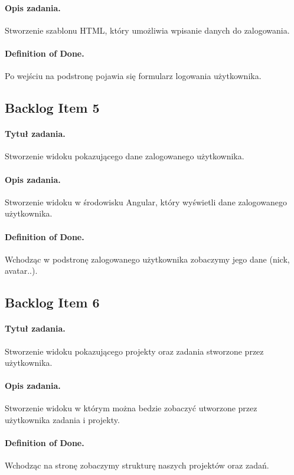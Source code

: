 \documentclass[a4paper]{article}
\begin{document}
\paragraph{Opis zadania.} Stworzenie szablonu HTML, który umożliwia wpisanie danych do zalogowania.
\paragraph{Definition of Done.} Po wejściu na podstronę pojawia się formularz logowania użytkownika.

\subsection{Backlog Item 5} 
\paragraph{Tytuł zadania.} Stworzenie widoku pokazującego dane zalogowanego użytkownika.
\paragraph{Opis zadania.} Stworzenie widoku w środowisku Angular, który wyświetli dane zalogowanego użytkownika.
\paragraph{Definition of Done.} Wchodząc w podstronę zalogowanego użytkownika zobaczymy jego dane (nick, avatar..).

\subsection{Backlog Item 6} 
\paragraph{Tytuł zadania.} Stworzenie widoku pokazującego projekty oraz zadania stworzone przez użytkownika.
\paragraph{Opis zadania.} Stworzenie widoku w którym można bedzie zobaczyć utworzone przez użytkownika zadania i projekty.
\paragraph{Definition of Done.} Wchodząc na stronę zobaczymy strukturę naszych projektów oraz zadań.
\end{document}
